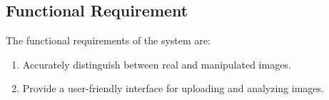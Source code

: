 \subsection{Functional Requirement}
The functional requirements of the system are:
\begin{enumerate}
    \item Accurately distinguish between real and manipulated images.
    \item Provide a user-friendly interface for uploading and analyzing images.

\end{enumerate}